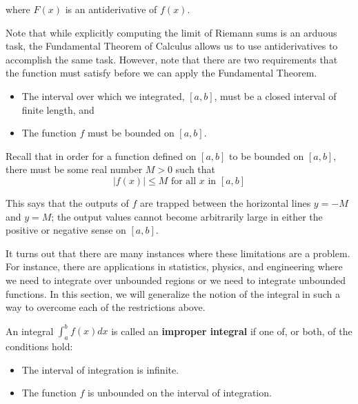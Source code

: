 \documentclass{ximera}
\begin{document}
where $F(x)$ is an antiderivative of $f(x)$.

Note that while explicitly computing the limit of Riemann sums is an arduous task, the Fundamental Theorem of Calculus allows us to use antiderivatives to accomplish the same task.  However, note that there are two requirements that the function must satisfy before we can apply the Fundamental Theorem.

\begin{itemize}
\item The interval over which we integrated, $[a,b]$, must be a closed interval of finite length, and
\item The function $f$ must be bounded on $[a,b]$.
\end{itemize}


\begin{remark}
Recall that in order for a function defined on $[a, b]$ to be bounded on $[a,b]$, there must be some real number $M>0$ such that 
\[
|f(x)| \leq M \text{ for all } x \text{ in } [a, b]
\]

This says that the outputs of $f$ are trapped between the horizontal lines $y=-M$ and $y=M$; the output values cannot 
become arbitrarily large in either the positive or negative sense on $[a,b]$. 
\end{remark}


It turns out that there are many instances where these limitations are a problem.  For instance, there are applications in statistics, physics, and engineering where we need to integrate over unbounded regions or we need to integrate unbounded functions.  In this section, we will generalize the notion of the integral in such a way to overcome each of the restrictions above.



\begin{definition}
  An integral $\int_a^b f(x) dx $
  is called an \textbf{improper integral} if one of, or both, of the conditions hold:
  \begin{itemize}
  \item The interval of integration is infinite.
  \item The function $f$ is unbounded on the interval of integration.
  \end{itemize}
\end{definition}
\end{document}
